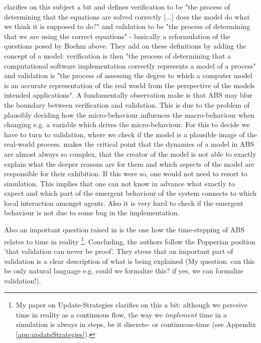 \cite{ormerod_epistemological_2009} clarifies on this subject a bit and defines verification to be "the process of determining that the equations are solved correctly [...] does the model do what we think it is supposed to do?" and validation to be "the process of determining that we are using the correct equations" - basically a reformulation of the questions posed by Boehm \cite{boehm_software_1989} above. They add on these definitions by adding the concept of a model: verification is then "the process of determining that a computational software implementation correctly represents a model of a process" and validation is "the process of assessing the degree to which a computer model is an accurate representation of the real world from the perspective of the models intended applications".
A fundamentally observation \cite{ormerod_epistemological_2009} make is that ABS may blur the boundary between verification and validation. This is due to the problem of plausibly deciding how the micro-behaviour influences the macro-behaviour when changing e.g. a variable which drives the micro-behaviour. For this to decide we have to turn to validation, where we check if the model is a plausible image of the real-world process.
\cite{galan_errors_2009} makes the critical point that the dynamics of a model in ABS are almost always so complex, that the creator of the model is not able to exactly explain what the deeper reasons are for them and which aspects of the model are responsible for their exhibition. If this were so, one would not need to resort to simulation. This implies that one can not know in advance what exactly to expect and which part of the emergent behaviour of the system connects to which local interaction amongst agents. Also it is very hard to check if the emergent behaviour is not due to some bug in the implementation.

Also an important question raised in \cite{ormerod_epistemological_2009} is the one how the time-stepping of ABS relates to time in reality \footnote{My paper on Update-Strategies clarifies on this a bit: although we perceive time in reality as a continuous flow, the way we \textit{implement} time in a simulation is always in steps, be it discrete- or continuous-time (see Appendix \ref{app:updateStrategies}).}. Concluding, the authors follow the Popperian position 'that validation can never be proof'. They stress that an important part of validation is a clear description of what is being explained (My question: can this be only natural language e.g. could we formalize this? if yes, we can formalize validation!).


